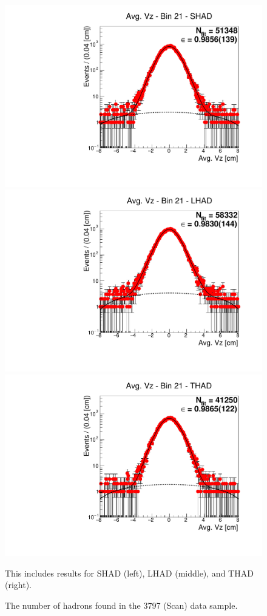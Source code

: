 \begin{figure}[H]
\centering
\includegraphics[scale=0.25]{figures/plots/nonDDbar_fit_results/scan/fit_scan_21_data_SHAD.pdf}
\hspace{-0.5cm}
\includegraphics[scale=0.25]{figures/plots/nonDDbar_fit_results/scan/fit_scan_21_data_LHAD.pdf}
\hspace{-0.5cm}
\includegraphics[scale=0.25]{figures/plots/nonDDbar_fit_results/scan/fit_scan_21_data_THAD.pdf}
\caption{The number of hadrons found in the 3797 (Scan) data sample.}
{This includes results for SHAD (left), LHAD (middle), and THAD (right).}
\label{fig:hadron_fits_scan_21}
\end{figure}

